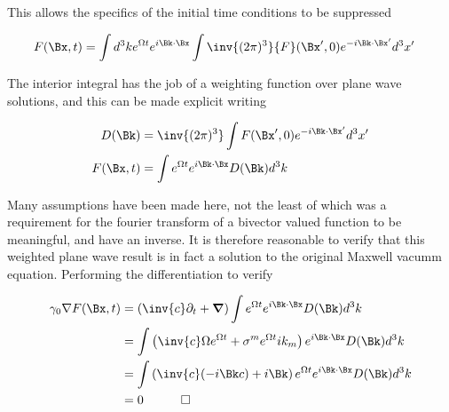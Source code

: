 \documentclass[]{eliblog}
\begin{document}
This allows the specifics of the initial time conditions to be suppressed

\begin{align}
F(\Bx,t) &= \int d^3 k e^{\Omega t} e^{i \Bk \cdot \Bx} \int \inv{(2\pi)^3} {F}(\Bx',0) e^{-i \Bk \cdot \Bx'}  d^3 x'
\end{align}

The interior integral has the job of a weighting function over plane wave solutions, and this can be made explicit writing

\begin{align}
D(\Bk) &= \inv{(2\pi)^3} \int {F}(\Bx',0) e^{-i \Bk \cdot \Bx'}  d^3 x' \\
F(\Bx,t) &= \int e^{\Omega t} e^{i \Bk \cdot \Bx} D(\Bk) d^3 k
\end{align}

Many assumptions have been made here, not the least of which was a requirement for the fourier transform of a bivector valued function to be meaningful, and have an inverse.  It is therefore reasonable to verify that this weighted plane wave result is in fact a solution to the original Maxwell vacumm equation.  Performing the differentiation to verify

\begin{align*}
\gamma_0 \grad F(\Bx,t) 
&= 
\left(\inv{c}\partial_t + \spacegrad \right)\int e^{\Omega t} e^{i \Bk \cdot \Bx} D(\Bk) d^3 k \\
&= 
\int \left(\inv{c}\Omega e^{\Omega t} + \sigma^m e^{\Omega t} i k_m \right) e^{i \Bk \cdot \Bx} D(\Bk) d^3 k \\
&= 
\int \left(\inv{c}(-i \Bk c) + i \Bk \right) e^{\Omega t} e^{i \Bk \cdot \Bx} D(\Bk) d^3 k \\
&= 0 \quad\quad\quad\square
\end{align*}




\end{document}
